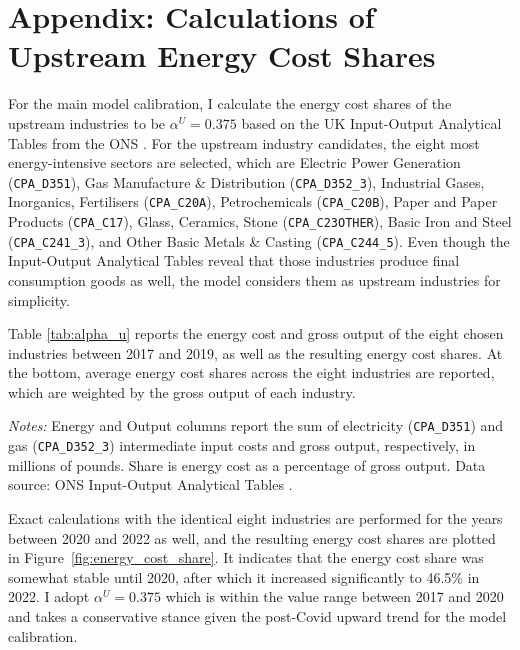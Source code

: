 \documentclass[a4paper, 12pt]{article}
\theoremstyle{definition*}
\begin{document}
\section{Appendix: Calculations of Upstream Energy Cost Shares}\label{sec:appendix-calculations}
For the main model calibration, I calculate the energy cost shares of the upstream industries to be $\alpha^U = 0.375$ based on the UK Input-Output Analytical Tables from the ONS \citep{ons2025uk}.
For the upstream industry candidates, the eight most energy-intensive sectors are selected, which are Electric Power Generation (\texttt{CPA\_D351}), Gas Manufacture \& Distribution (\texttt{CPA\_D352\_3}), Industrial Gases, Inorganics, Fertilisers (\texttt{CPA\_C20A}), Petrochemicals (\texttt{CPA\_C20B}), Paper and Paper Products (\texttt{CPA\_C17}), Glass, Ceramics, Stone (\texttt{CPA\_C23OTHER}), Basic Iron and Steel (\texttt{CPA\_C241\_3}), and Other Basic Metals \& Casting (\texttt{CPA\_C244\_5}).
Even though the Input-Output Analytical Tables reveal that those industries produce final consumption goods as well, the model considers them as upstream industries for simplicity.

Table \ref{tab:alpha_u} reports the energy cost and gross output of the eight chosen industries between 2017 and 2019, as well as the resulting energy cost shares.
At the bottom, average energy cost shares across the eight industries are reported, which are weighted by the gross output of each industry.

\begin{table}[h!]
\centering
\begin{threeparttable}
\caption{Energy Cost Shares of Upstream Industries between 2017 and 2019 (\pounds m)}
\label{tab:alpha_u}
\footnotesize
\setlength{\tabcolsep}{3pt}

\begin{tablenotes}[flushleft]
\footnotesize
\item \textit{Notes:} Energy and Output columns report the sum of electricity (\texttt{CPA\_D351}) and gas (\texttt{CPA\_D352\_3}) intermediate input costs and gross output, respectively, in millions of pounds. Share is energy cost as a percentage of gross output. Data source: ONS Input-Output Analytical Tables \citep{ons2025uk}.
\end{tablenotes}
\end{threeparttable}
\end{table}

Exact calculations with the identical eight industries are performed for the years between 2020 and 2022 as well, and the resulting energy cost shares are plotted in Figure~\ref{fig:energy_cost_share}.
It indicates that the energy cost share was somewhat stable until 2020, after which it increased significantly to 46.5\% in 2022.
I adopt $\alpha^U = 0.375$ which is within the value range between 2017 and 2020 and takes a conservative stance given the post-Covid upward trend for the model calibration.
\end{document}
